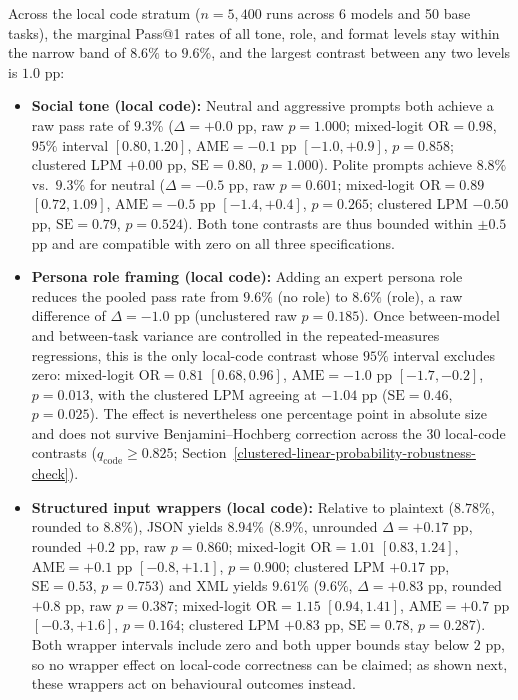 \documentclass[a4paper,fleqn]{cas-sc}
\providecommand{\tightlist}{%
  \setlength{\itemsep}{0pt}\setlength{\parskip}{0pt}}
\begin{document}
Across the local code stratum ($n = 5,400$ runs across 6 models and 50 base tasks), the marginal Pass@1 rates of all tone, role, and format levels stay within the narrow band of $8.6\%$ to $9.6\%$, and the largest contrast between any two levels is $1.0$ pp:
\begin{itemize}
\tightlist
\item \textbf{Social tone (local code):} Neutral and aggressive prompts both achieve a raw pass rate of $9.3\%$ ($\Delta = +0.0$ pp, raw $p = 1.000$; mixed-logit $\text{OR} = 0.98$, $95\%$ interval $[0.80, 1.20]$, $\text{AME} = -0.1$ pp $[-1.0, +0.9]$, $p = 0.858$; clustered LPM $+0.00$ pp, $\text{SE} = 0.80$, $p = 1.000$). Polite prompts achieve $8.8\%$ vs.\ $9.3\%$ for neutral ($\Delta = -0.5$ pp, raw $p = 0.601$; mixed-logit $\text{OR} = 0.89$ $[0.72, 1.09]$, $\text{AME} = -0.5$ pp $[-1.4, +0.4]$, $p = 0.265$; clustered LPM $-0.50$ pp, $\text{SE} = 0.79$, $p = 0.524$). Both tone contrasts are thus bounded within $\pm 0.5$ pp and are compatible with zero on all three specifications.
\item \textbf{Persona role framing (local code):} Adding an expert persona role reduces the pooled pass rate from $9.6\%$ (no role) to $8.6\%$ (role), a raw difference of $\Delta = -1.0$ pp (unclustered raw $p = 0.185$). Once between-model and between-task variance are controlled in the repeated-measures regressions, this is the only local-code contrast whose $95\%$ interval excludes zero: mixed-logit $\text{OR} = 0.81$ $[0.68, 0.96]$, $\text{AME} = -1.0$ pp $[-1.7, -0.2]$, $p = 0.013$, with the clustered LPM agreeing at $-1.04$ pp ($\text{SE} = 0.46$, $p = 0.025$). The effect is nevertheless one percentage point in absolute size and does not survive Benjamini--Hochberg correction across the 30 local-code contrasts ($q_{\text{code}} \ge 0.825$; Section~\ref{clustered-linear-probability-robustness-check}).
\item \textbf{Structured input wrappers (local code):} Relative to plaintext ($8.78\%$, rounded to $8.8\%$), JSON yields $8.94\%$ ($8.9\%$, unrounded $\Delta = +0.17$ pp, rounded $+0.2$ pp, raw $p = 0.860$; mixed-logit $\text{OR} = 1.01$ $[0.83, 1.24]$, $\text{AME} = +0.1$ pp $[-0.8, +1.1]$, $p = 0.900$; clustered LPM $+0.17$ pp, $\text{SE} = 0.53$, $p = 0.753$) and XML yields $9.61\%$ ($9.6\%$, $\Delta = +0.83$ pp, rounded $+0.8$ pp, raw $p = 0.387$; mixed-logit $\text{OR} = 1.15$ $[0.94, 1.41]$, $\text{AME} = +0.7$ pp $[-0.3, +1.6]$, $p = 0.164$; clustered LPM $+0.83$ pp, $\text{SE} = 0.78$, $p = 0.287$). Both wrapper intervals include zero and both upper bounds stay below $2$ pp, so no wrapper effect on local-code correctness can be claimed; as shown next, these wrappers act on behavioural outcomes instead.
\end{itemize}
\end{document}
